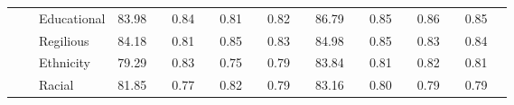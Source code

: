 \begin{table}[!tbh]
{\begin{tabular}{l|l|l|llllllll||llllllll}
                       &                                 & Educational             & \multicolumn{1}{l|}{83.98} & \multicolumn{1}{l|}{}                       & \multicolumn{1}{l|}{0.84} & \multicolumn{1}{l|}{}                      & \multicolumn{1}{l|}{0.81} & \multicolumn{1}{l|}{}                      & \multicolumn{1}{l|}{0.82} &                       & \multicolumn{1}{l|}{86.79} & \multicolumn{1}{l|}{}                       & \multicolumn{1}{l|}{0.85} & \multicolumn{1}{l|}{}                      & \multicolumn{1}{l|}{0.86} & \multicolumn{1}{l|}{}                      & \multicolumn{1}{l|}{0.85} &                       \\ \cline{3-4} \cline{6-6} \cline{8-8} \cline{10-10} \cline{12-12} \cline{14-14} \cline{16-16} \cline{18-18}
                       &                                 & Regilious               & \multicolumn{1}{l|}{84.18} & \multicolumn{1}{l|}{}                       & \multicolumn{1}{l|}{0.81} & \multicolumn{1}{l|}{}                      & \multicolumn{1}{l|}{0.85} & \multicolumn{1}{l|}{}                      & \multicolumn{1}{l|}{0.83} &                       & \multicolumn{1}{l|}{84.98} & \multicolumn{1}{l|}{}                       & \multicolumn{1}{l|}{0.85} & \multicolumn{1}{l|}{}                      & \multicolumn{1}{l|}{0.83} & \multicolumn{1}{l|}{}                      & \multicolumn{1}{l|}{0.84} &                       \\ \cline{3-4} \cline{6-6} \cline{8-8} \cline{10-10} \cline{12-12} \cline{14-14} \cline{16-16} \cline{18-18}
                       &                                 & Ethnicity               & \multicolumn{1}{l|}{79.29} & \multicolumn{1}{l|}{}                       & \multicolumn{1}{l|}{0.83} & \multicolumn{1}{l|}{}                      & \multicolumn{1}{l|}{0.75} & \multicolumn{1}{l|}{}                      & \multicolumn{1}{l|}{0.79} &                       & \multicolumn{1}{l|}{83.84} & \multicolumn{1}{l|}{}                       & \multicolumn{1}{l|}{0.81} & \multicolumn{1}{l|}{}                      & \multicolumn{1}{l|}{0.82} & \multicolumn{1}{l|}{}                      & \multicolumn{1}{l|}{0.81} &                       \\ \cline{3-4} \cline{6-6} \cline{8-8} \cline{10-10} \cline{12-12} \cline{14-14} \cline{16-16} \cline{18-18}
                       &                                 & Racial                  & \multicolumn{1}{l|}{81.85} & \multicolumn{1}{l|}{}                       & \multicolumn{1}{l|}{0.77} & \multicolumn{1}{l|}{}                      & \multicolumn{1}{l|}{0.82} & \multicolumn{1}{l|}{}                      & \multicolumn{1}{l|}{0.79} &                       & \multicolumn{1}{l|}{83.16} & \multicolumn{1}{l|}{}                       & \multicolumn{1}{l|}{0.80} & \multicolumn{1}{l|}{}                      & \multicolumn{1}{l|}{0.79} & \multicolumn{1}{l|}{}                      & \multicolumn{1}{l|}{0.79} &                       \\ \cline{3-4} \cline{6-6} \cline{8-8} \cline{10-10} \cline{12-12} \cline{14-14} \cline{16-16} \cline{18-18}

\end{tabular}}
\end{table}

